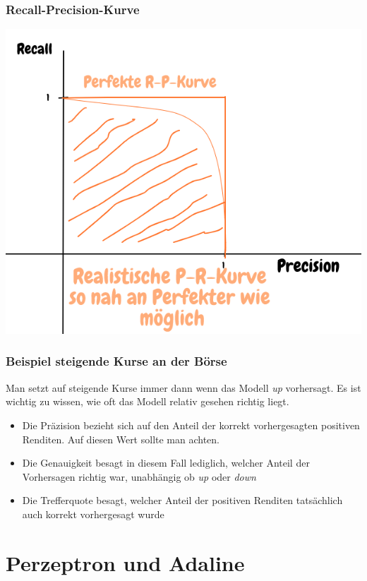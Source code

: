 \documentclass{report}
\begin{document}
  \subsection{Recall-Precision-Kurve}	
  \begin{center}	
    \includegraphics[scale=.225]{ml03_8}	
  \end{center}	
  
  \subsection{Beispiel steigende Kurse an der Börse}	
  Man setzt auf steigende Kurse immer dann wenn das Modell \textit{up} vorhersagt. Es ist wichtig zu wissen, wie oft das Modell relativ gesehen richtig liegt.	
  \begin{itemize}	
    \item Die Präzision bezieht sich auf den Anteil der korrekt vorhergesagten positiven Renditen. Auf diesen Wert sollte man achten.	
    \item Die Genauigkeit besagt in diesem Fall lediglich, welcher Anteil der Vorhersagen richtig war, unabhängig ob \textit{up} oder \textit{down}	
    \item Die Trefferquote besagt, welcher Anteil der positiven Renditen tatsächlich auch korrekt vorhergesagt wurde	
  \end{itemize}	
  
  \chapter{Perzeptron und Adaline}	
\end{document}
